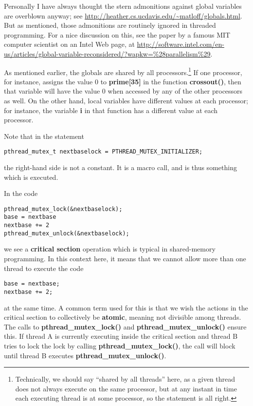 Personally I have always thought the stern admonitions against global
variables are overblown anyway; see
\url{http://heather.cs.ucdavis.edu/~matloff/globals.html}.  But as
mentioned, those admonitions are routinely ignored in threaded
programming.  For a nice discussion on this, see the paper by a famous
MIT computer scientist on an Intel Web page, at
\url{http://software.intel.com/en-us/articles/global-variable-reconsidered/?wapkw=%28parallelism%29}.

As mentioned earlier, the globals are shared by all
processors.\footnote{Technically, we should say ``shared by all
threads'' here, as a given thread does not always execute on the same
processor, but at any instant in time each executing thread is at some
processor, so the statement is all right.} If one processor, for
instance, assigns the value 0 to {\bf prime{[}35{]}} in the function
{\bf crossout()}, then that variable will have the value 0 when accessed
by any of the other processors as well.  On the other hand, local
variables have different values at each processor; for instance, the
variable {\bf i} in that function has a different value at each
processor.

Note that in the statement

\begin{Verbatim}
pthread_mutex_t nextbaselock = PTHREAD_MUTEX_INITIALIZER;
\end{Verbatim}

the right-hand side is not a constant.  It is a macro call, and is thus
something which is executed.

In the code

\begin{Verbatim}
pthread_mutex_lock(&nextbaselock);
base = nextbase
nextbase += 2
pthread_mutex_unlock(&nextbaselock);
\end{Verbatim}

we see a \textbf{critical section} operation which is
typical in shared-memory programming.  In this context here, it means
that we cannot allow more than one thread to execute the code

\begin{Verbatim}
base = nextbase;
nextbase += 2;
\end{Verbatim}

at the same time.  A common term used for this is that we wish the
actions in the critical section to collectively be {\bf atomic}, meaning
not divisible among threads.  The calls to {\bf pthread\_mutex\_lock()}
and {\bf pthread\_mutex\_unlock()} ensure this.  If thread A is
currently executing inside the critical section and thread B tries to
lock the lock by calling {\bf pthread\_mutex\_lock()}, the call will
block until thread B executes {\bf pthread\_mutex\_unlock()}.

